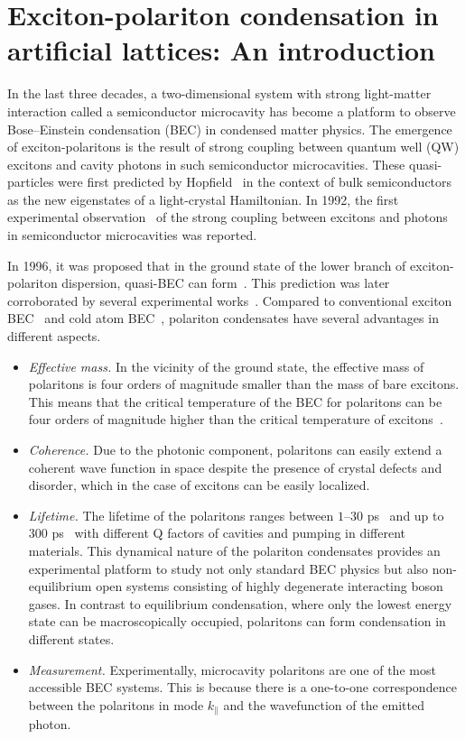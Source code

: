 \chapter{Exciton-polariton condensation in artificial lattices: An introduction}\label{CHONE}
In the last three decades, a two-dimensional system with strong light-matter interaction called a semiconductor microcavity has become a platform to observe Bose--Einstein condensation (BEC) in condensed matter physics.
The emergence of exciton-polaritons is the result of strong coupling between quantum well (QW) excitons and cavity photons in such semiconductor microcavities.
These quasi-particles were first predicted by Hopfield~\cite{Hopfield:1958aa} in the context of bulk semiconductors as the new eigenstates of a light-crystal Hamiltonian.
In 1992, the first experimental observation~\cite{Weisbuch:1992aa} of the strong coupling between excitons and photons in semiconductor microcavities was reported.

In 1996, it was proposed that in the ground state of the lower branch of exciton-polariton dispersion, quasi-BEC can form~\cite{Imamogu:1996aa}.
This prediction was later corroborated by several experimental works~\cite{Deng:2002aa,Kasprzak:2006aa,Balili:2007aa}.
Compared to conventional exciton BEC~\cite{Hanamura:1977aa} and cold atom BEC~\cite{Davis:1995aa,Pethick:2002tn}, polariton condensates have several advantages in different aspects.
%
\begin{itemize}
    \item \textit{Effective mass.}
In the vicinity of the ground state, the effective mass of polaritons is four orders of magnitude smaller than the mass of bare excitons.
This means that the critical temperature of the BEC for polaritons can be four orders of magnitude higher than the critical temperature of excitons~\cite{Pethick:2002tn}.
    \item \textit{Coherence.}
Due to the photonic component, polaritons can easily extend a coherent wave function in space despite the presence of crystal defects and disorder, which in the case of excitons can be easily localized.
    \item \textit{Lifetime.}
The lifetime of the polaritons ranges between $1$--$30$ ps~\cite{Wertz:2010aa} and up to $300$ ps~\cite{Sun:2017aa} with different Q factors of cavities and pumping in different materials.
This dynamical nature of the polariton condensates provides an experimental platform to study not only standard BEC physics but also non-equilibrium open systems consisting of highly degenerate interacting boson gases.
In contrast to equilibrium condensation, where only the lowest energy state can be macroscopically occupied, polaritons can form condensation in different states.
    \item \textit{Measurement.}
Experimentally, microcavity polaritons are one of the most accessible BEC systems.
This is because there is a one-to-one correspondence between the polaritons in mode $k_\parallel$ and the wavefunction of the emitted photon.
\end{itemize}
%

